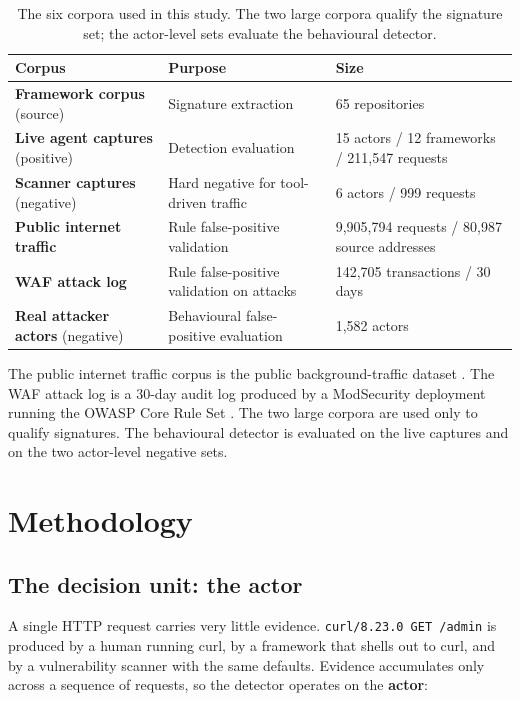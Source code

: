 \documentclass[11pt]{article}
\begin{document}
\begin{table}[t]
\centering
\caption{The six corpora used in this study. The two large corpora qualify the signature set;
the actor-level sets evaluate the behavioural detector.}
\label{tab:corpora}
\begin{tabularx}{\textwidth}{@{}L{0.26\textwidth}Y L{0.30\textwidth}@{}}
\toprule
\textbf{Corpus} & \textbf{Purpose} & \textbf{Size} \\
\midrule
\textbf{Framework corpus} (source) & Signature extraction & 65 repositories \\
\textbf{Live agent captures} (positive) & Detection evaluation & 15 actors / 12 frameworks / 211,547 requests \\
\textbf{Scanner captures} (negative) & Hard negative for tool-driven traffic & 6 actors / 999 requests \\
\textbf{Public internet traffic} & Rule false-positive validation & 9,905,794 requests / 80,987 source addresses \\
\textbf{WAF attack log} & Rule false-positive validation on attacks & 142,705 transactions / 30 days \\
\textbf{Real attacker actors} (negative) & Behavioural false-positive evaluation & 1,582 actors \\
\bottomrule
\end{tabularx}
\end{table}

The public internet traffic corpus is the public background-traffic dataset
\cite{burpheartbg}. The WAF attack log is a 30-day audit log produced by a ModSecurity
deployment running the OWASP Core Rule Set \cite{owaspcrs,modsecurity}. The two large corpora
are used only to qualify signatures. The behavioural detector is evaluated on the live captures
and on the two actor-level negative sets.

\section{Methodology}
\label{sec:method}

\subsection{The decision unit: the actor}
\label{sec:actor}

A single HTTP request carries very little evidence. \texttt{curl/8.23.0 GET /admin} is
produced by a human running curl, by a framework that shells out to curl, and by a
vulnerability scanner with the same defaults. Evidence accumulates only across a sequence of
requests, so the detector operates on the \textbf{actor}:
\end{document}
